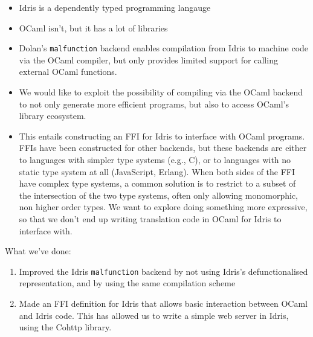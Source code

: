\documentclass[a4paper,11pt,twocolumn]{article}
\newcommand{\malfunction}{\texttt{malfunction}}
\begin{document}




\begin{itemize}
\item Idris is a dependently typed programming langauge
\item OCaml isn't, but it has a lot of libraries
\item Dolan's \texttt{malfunction} backend enables compilation from
  Idris to machine code via the OCaml compiler, but only provides
  limited support for calling external OCaml functions.
\item We would like to exploit the possibility of compiling via the
  OCaml backend to not only generate more efficient programs, but also
  to access OCaml's library ecosystem.
\item This entails constructing an FFI for Idris to interface with
  OCaml programs. FFIs have been constructed for other backends, but
  these backends are either to languages with simpler type systems
  (e.g., C), or to languages with no static type system at all
  (JavaScript, Erlang). When both sides of the FFI have complex type
  systems, a common solution is to restrict to a subset of the
  intersection of the two type systems, often only allowing
  monomorphic, non higher order types. We want to explore doing
  something more expressive, so that we don't end up writing
  translation code in OCaml for Idris to interface with.
\end{itemize}

What we've done:
\begin{enumerate}
\item Improved the Idris \malfunction{} backend by not using Idris's
  defunctionalised representation, and by using the same compilation
  scheme
\item Made an FFI definition for Idris that allows basic interaction
  between OCaml and Idris code. This has allowed us to write a simple
  web server in Idris, using the Cohttp library.
\end{enumerate}
\end{document}
